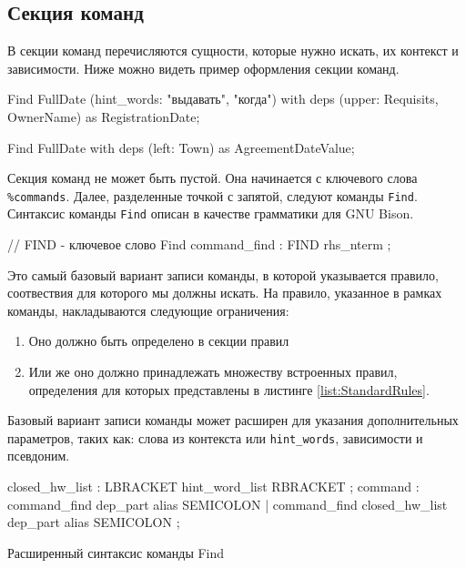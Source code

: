 \subsection{Секция команд}
\label{subsect:CommandSection}
В секции команд перечисляются сущности, которые нужно искать, их контекст и зависимости. Ниже можно видеть пример оформления секции команд.
\begin{Verb}
Find FullDate (hint_words: "выдавать", "когда") 
with deps (upper: Requisits, OwnerName) 
as RegistrationDate;

Find FullDate with deps (left: Town) as AgreementDateValue;
\end{Verb}
Секция команд не может быть пустой. Она начинается с ключевого слова \lstinline{%commands}. Далее, разделенные точкой с запятой, следуют команды \lstinline{Find}. Синтаксис команды \lstinline{Find} описан в качестве грамматики для GNU Bison.
\begin{Verb}
// FIND - ключевое слово Find
command_find
    : FIND rhs_nterm
    ;
\end{Verb}
Это самый базовый вариант записи команды, в которой указывается правило, соотвествия для которого мы должны искать. На правило, указанное в рамках команды, накладываются следующие ограничения:
\begin{enumerate}
  \item Оно должно быть определено в секции правил
  \item Или же оно должно принадлежать множеству встроенных правил, определения для которых представлены в листинге \ref{list:StandardRules}.
\end{enumerate}

Базовый вариант записи команды может расширен для указания дополнительных параметров, таких как: слова из контекста или \lstinline{hint_words}, зависимости и псевдоним.
\begin{ListingEnv}
\begin{Verb}
closed_hw_list
    : LBRACKET hint_word_list RBRACKET
    ;
command
    : command_find dep_part alias SEMICOLON
    | command_find closed_hw_list dep_part alias SEMICOLON
    ;
\end{Verb}
\caption{Расширенный синтаксис команды Find}
\label{list:FindExtSyntax}
\end{ListingEnv}

